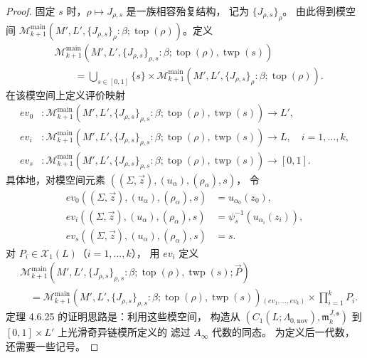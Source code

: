 \begin{proof}
固定 $s$ 时，$\rho\mapsto J_{\rho,s}$ 是一族相容殆复结构，
记为 $\{J_{\rho,s}\}_\rho$。
由此得到模空间
$\mathcal M_{k+1}^{\mathrm{main}}
(M',L',\{J_{\rho,s}\}_\rho:
\beta;\operatorname{top}(\rho))$。定义
\begin{equation}
\begin{aligned}
&\mathcal M_{k+1}^{\mathrm{main}}
(M',L',\{J_{\rho,s}\}_{\rho,s}:
\beta;\operatorname{top}(\rho),\operatorname{twp}(s))\\
&\qquad=
\bigcup_{s\in[0,1]}\{s\}\times
\mathcal M_{k+1}^{\mathrm{main}}
(M',L',\{J_{\rho,s}\}_\rho:
\beta;\operatorname{top}(\rho)).
\end{aligned}
\tag{4.6.27}\label{eq:4-6-27}
\end{equation}
在该模空间上定义评价映射
\[
\begin{aligned}
ev_0&\colon\mathcal M_{k+1}^{\mathrm{main}}
(M',L',\{J_{\rho,s}\}_{\rho,s}:
\beta;\operatorname{top}(\rho),\operatorname{twp}(s))
\longrightarrow L',\\
ev_i&\colon\mathcal M_{k+1}^{\mathrm{main}}
(M',L',\{J_{\rho,s}\}_{\rho,s}:
\beta;\operatorname{top}(\rho),\operatorname{twp}(s))
\longrightarrow L,\quad i=1,\ldots,k,\\
ev_s&\colon\mathcal M_{k+1}^{\mathrm{main}}
(M',L',\{J_{\rho,s}\}_{\rho,s}:
\beta;\operatorname{top}(\rho),\operatorname{twp}(s))
\longrightarrow[0,1].
\end{aligned}
\]
具体地，对模空间元素
$((\Sigma,\vec z),(u_\alpha),(\rho_\alpha),s)$，
令
\begin{align}
ev_0((\Sigma,\vec z),(u_\alpha),(\rho_\alpha),s)
 &=u_{\alpha_0}(z_0),
 \tag{4.6.28.1}\label{eq:4-6-28-1}\\
ev_i((\Sigma,\vec z),(u_\alpha),(\rho_\alpha),s)
 &=\psi_s^{-1}(u_{\alpha_i}(z_i)),
 \tag{4.6.28.2}\label{eq:4-6-28-2}\\
ev_s((\Sigma,\vec z),(u_\alpha),(\rho_\alpha),s)
 &=s.
 \tag{4.6.28.3}\label{eq:4-6-28-3}
\end{align}
对 $P_i\in\mathcal X_1(L)$（$i=1,\ldots,k$），
用 $ev_i$ 定义
\begin{equation}
\begin{aligned}
&\mathcal M_{k+1}^{\mathrm{main}}
(M',L',\{J_{\rho,s}\}_{\rho,s}:
\beta;\operatorname{top}(\rho),\operatorname{twp}(s);\vec P)\\
&\quad=
\mathcal M_{k+1}^{\mathrm{main}}
(M',L',\{J_{\rho,s}\}_{\rho,s}:
\beta;\operatorname{top}(\rho),\operatorname{twp}(s))
{}_{(ev_1,\ldots,ev_k)}\!\times
\prod_{i=1}^kP_i .
\end{aligned}
\tag{4.6.29}\label{eq:4-6-29}
\end{equation}
定理 4.6.25 的证明思路是：利用这些模空间，
构造从 $(C_1(L;\Lambda_{0,\mathrm{nov}}),
\mathfrak m_k^{J,\mathfrak s})$
到 $[0,1]\times L'$ 上光滑奇异链模所定义的
滤过 $A_\infty$ 代数的同态。
为定义后一代数，还需要一些记号。


\end{proof}
